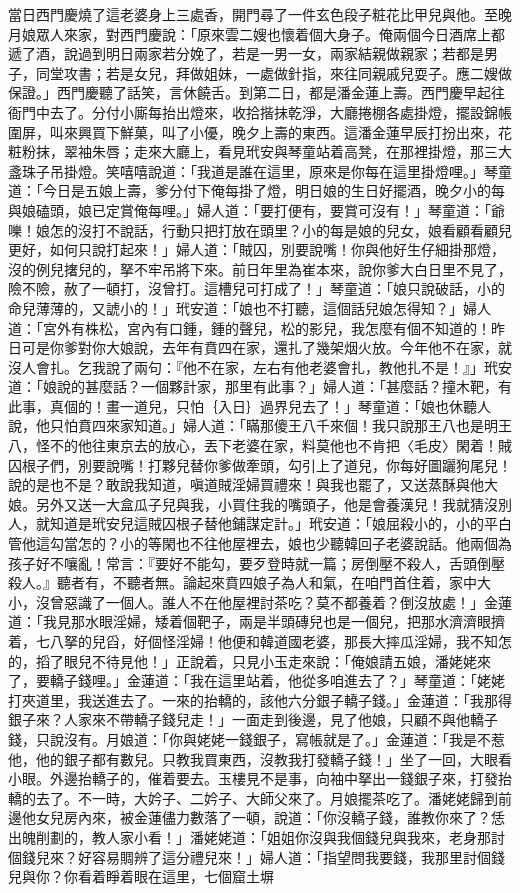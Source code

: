 當日西門慶燒了這老婆身上三處香，開門尋了一件玄色段子粧花比甲兒與他。至晚月娘眾人來家，對西門慶說：「原來雲二嫂也懷着個大身子。俺兩個今日酒席上都遞了酒，說過到明日兩家若分娩了，若是一男一女，兩家結親做親家；若都是男子，同堂攻書；若是女兒，拜做姐妹，一處做針指，來往同親戚兒耍子。應二嫂做保證。」西門慶聽了話笑，言休饒舌。到第二日，都是潘金蓮上壽。西門慶早起往衙門中去了。分付小廝每抬出燈來，收拾揩抹乾淨，大廳捲棚各處掛燈，擺設錦帳圍屏，叫來興買下鮮菓，叫了小優，晚夕上壽的東西。這潘金蓮早辰打扮出來，花粧粉抹，翠袖朱唇；走來大廳上，看見玳安與琴童站着高凳，在那裡掛燈，那三大盞珠子吊掛燈。笑嘻嘻說道：「我道是誰在這里，原來是你每在這里掛燈哩。」琴童道：「今日是五娘上壽，爹分付下俺每掛了燈，明日娘的生日好擺酒，晚夕小的每與娘磕頭，娘已定賞俺每哩。」婦人道：「要打便有，要賞可沒有！」琴童道：「爺嚛！娘怎的沒打不說話，行動只把打放在頭里？小的每是娘的兒女，娘看顧看顧兒更好，如何只說打起來！」婦人道：「賊囚，別要說嘴！你與他好生仔細掛那燈，沒的例兒撦兒的，拏不牢吊將下來。前日年里為崔本來，說你爹大白日里不見了，險不險，赦了一頓打，沒曾打。這槽兒可打成了！」琴童道：「娘只說破話，小的命兒薄薄的，又諕小的！」玳安道：「娘也不打聽，這個話兒娘怎得知？」婦人道：「宮外有株松，宮內有口鍾，鍾的聲兒，松的影兒，我怎麼有個不知道的！昨日可是你爹對你大娘說，去年有賁四在家，還扎了幾架烟火放。今年他不在家，就沒人會扎。乞我說了兩句：『他不在家，左右有他老婆會扎，教他扎不是！』」玳安道：「娘說的甚麼話？一個夥計家，那里有此事？」婦人道：「甚麼話？撞木靶，有此事，真個的！畫一道兒，只怕｛入日｝過界兒去了！」琴童道：「娘也休聽人說，他只怕賁四來家知道。」婦人道：「瞞那傻王八千來個！我只說那王八也是明王八，怪不的他往東京去的放心，丟下老婆在家，料莫他也不肯把〈毛皮〉閑着！賊囚根子們，別要說嘴！打夥兒替你爹做牽頭，勾引上了道兒，你每好圖躧狗尾兒！說的是也不是？敢說我知道，嗔道賊淫婦買禮來！與我也罷了，又送蒸酥與他大娘。另外又送一大盒瓜子兒與我，小買住我的嘴頭子，他是會養漢兒！我就猜沒別人，就知道是玳安兒這賊囚根子替他鋪謀定計。」玳安道：「娘屈殺小的，小的平白管他這勾當怎的？小的等閑也不往他屋裡去，娘也少聽韓回子老婆說話。他兩個為孩子好不嚷亂！常言：『要好不能勾，要歹登時就一篇；房倒壓不殺人，舌頭倒壓殺人。』聽者有，不聽者無。論起來賁四娘子為人和氣，在咱門首住着，家中大小，沒曾惡識了一個人。誰人不在他屋裡討茶吃？莫不都養着？倒沒放處！」金蓮道：「我見那水眼淫婦，矮着個靶子，兩是半頭磚兒也是一個兒，把那水濟濟眼擠着，七八拏的兒舀，好個怪淫婦！他便和韓道國老婆，那長大摔瓜淫婦，我不知怎的，搯了眼兒不待見他！」正說着，只見小玉走來說：「俺娘請五娘，潘姥姥來了，要轎子錢哩。」金蓮道：「我在這里站着，他從多咱進去了？」琴童道：「姥姥打夾道里，我送進去了。一來的抬轎的，該他六分銀子轎子錢。」金蓮道：「我那得銀子來？人家來不帶轎子錢兒走！」一面走到後邊，見了他娘，只顧不與他轎子錢，只說沒有。月娘道：「你與姥姥一錢銀子，寫帳就是了。」金蓮道：「我是不惹他，他的銀子都有數兒。只教我買東西，沒教我打發轎子錢！」坐了一回，大眼看小眼。外邊抬轎子的，催着要去。玉樓見不是事，向袖中拏出一錢銀子來，打發抬轎的去了。不一時，大妗子、二妗子、大師父來了。月娘擺茶吃了。潘姥姥歸到前邊他女兒房內來，被金蓮儘力數落了一頓，說道：「你沒轎子錢，誰教你來了？恁出魄削劃的，教人家小看！」潘姥姥道：「姐姐你沒與我個錢兒與我來，老身那討個錢兒來？好容易賙辨了這分禮兒來！」婦人道：「指望問我要錢，我那里討個錢兒與你？你看着睜着眼在這里，七個窟土塀
